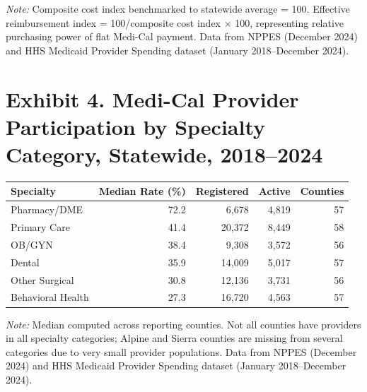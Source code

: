 \documentclass[12pt]{article}
\begin{document}
\noindent\textit{Note:} Composite cost index benchmarked to statewide average = 100. Effective reimbursement index = 100/composite cost index $\times$ 100, representing relative purchasing power of flat Medi-Cal payment. Data from NPPES (December 2024) and HHS Medicaid Provider Spending dataset (January 2018--December 2024).


\newpage
\section*{Exhibit 4. Medi-Cal Provider Participation by Specialty Category, Statewide, 2018--2024}

\begin{table}[H]
\centering
\begin{tabular}{lrrrr}
\toprule
Specialty & Median Rate (\%) & Registered & Active & Counties \\
\midrule
Pharmacy/DME & 72.2 & 6,678 & 4,819 & 57 \\
Primary Care & 41.4 & 20,372 & 8,449 & 58 \\
OB/GYN & 38.4 & 9,308 & 3,572 & 56 \\
Dental & 35.9 & 14,009 & 5,017 & 57 \\
Other Surgical & 30.8 & 12,136 & 3,731 & 56 \\
Behavioral Health & 27.3 & 16,720 & 4,563 & 57 \\
\bottomrule
\end{tabular}
\end{table}

\noindent\textit{Note:} Median computed across reporting counties. Not all counties have providers in all specialty categories; Alpine and Sierra counties are missing from several categories due to very small provider populations. Data from NPPES (December 2024) and HHS Medicaid Provider Spending dataset (January 2018--December 2024).
\end{document}
